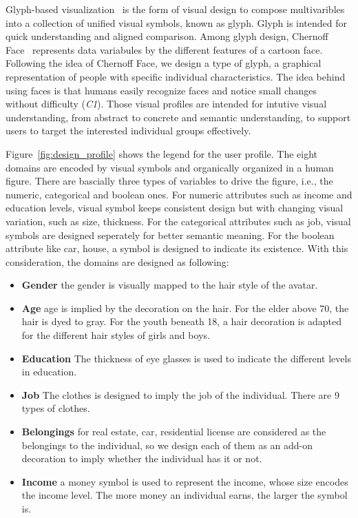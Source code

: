 Glyph-based visualization~\cite{borgo2013glyph} is the form of visual design to compose multivaribles into a collection of unified visual symbols, known as glyph. Glyph is intended for quick understanding and aligned comparison. Among glyph design, Chernoff Face~\cite{chernoff1973use} represents data variabules by the different features of a cartoon face. Following the idea of Chernoff Face, we design a type of glyph, a graphical representation of people with specific individual characteristics. The idea behind using faces is that humans easily recognize faces and notice small changes without difficulty (\textit{C1}). Those visual profiles are intended for intutive visual understanding, from abstract to concrete and semantic understanding, to support users to target the interested individual groups effectively.

Figure~\ref{fig:design_profile} shows the legend for the user profile. The eight domains are encoded by visual symbols and organically organized in a human figure. There are bascially three types of variables to drive the figure, i.e., the numeric, categorical and boolean ones. For numeric attributes such as income and education levels, visual symbol keeps consistent design but with changing visual variation, such as size, thickness. For the categorical attributes such as job, visual symbols are designed seperately for better semantic meaning. For the boolean attribute like car, house, a symbol is designed to indicate its existence. With this consideration, the domains are designed as following:



\begin{itemize}
\item \textbf{Gender} the gender is visually mapped to the hair style of the avatar. 
\item \textbf{Age} age is implied by the decoration on the hair. For the elder above 70, the hair is dyed to gray. For the youth beneath 18, a hair decoration is adapted for the different hair styles of girls and boys.
\item \textbf{Education} The thickness of eye glasses is used to indicate the different levels in education.
\item \textbf{Job} The clothes is designed to imply the job of the individual. There are 9 types of clothes.
\item \textbf{Belongings} for real estate, car, residential license are considered as the belongings to the individual, so we design each of them as an add-on decoration to imply whether the individual has it or not.
\item \textbf{Income} a money symbol is used to represent the income, whose size encodes the income level. The more money an individual earns, the larger the symbol is.
\end{itemize} 

